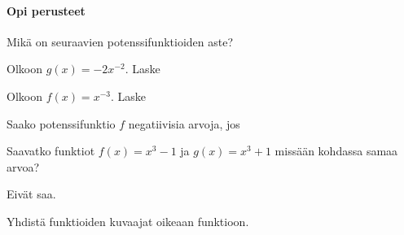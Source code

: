 \begin{tehtavasivu}

\paragraph*{Opi perusteet}

\begin{tehtava}
Mikä on seuraavien potenssifunktioiden aste?
\begin{vastaus}
\end{vastaus}
\end{tehtava}

\begin{tehtava}
Olkoon $g(x)=-2x^{-2}$. Laske
\begin{vastaus}
\end{vastaus}
\end{tehtava}

\begin{tehtava}
Olkoon $f(x)=x^{-3}$. Laske
\begin{vastaus}
\end{vastaus}
\end{tehtava}

\begin{tehtava}
Saako potenssifunktio $f$ negatiivisia arvoja, jos
\begin{vastaus}
\end{vastaus}
\end{tehtava}

\begin{tehtava}
Saavatko funktiot $ f(x)=x^{3}-1$ ja $ g(x)=x^{3}+1$ missään kohdassa samaa arvoa?
\begin{vastaus}
Eivät saa.
\end{vastaus}
\end{tehtava}

\begin{tehtava}
Yhdistä funktioiden kuvaajat oikeaan funktioon.


\end{tehtava}
\end{tehtavasivu}
